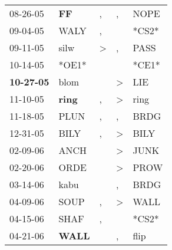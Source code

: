 \begin{supertabular}{p{0.07\textwidth}p{0.06\textwidth}p{0.02\textwidth}p{0.02\textwidth}p{0.06\textwidth}}
          08-26-05\textsuperscript{} &    \textbf{FF\textsuperscript{}} &                , &                , &           NOPE\textsuperscript{} \\
          09-04-05\textsuperscript{} &           WALY\textsuperscript{} &                , &                  &                            *CS2* \\
          09-11-05\textsuperscript{} &           silw\textsuperscript{} &     \textgreater &                , &           PASS\textsuperscript{} \\
          10-14-05\textsuperscript{} &                            *OE1* &                  &                  &                            *CE1* \\
 \textbf{10-27-05\textsuperscript{}} &           blom\textsuperscript{} &                  &     \textgreater &            LIE\textsuperscript{} \\
          11-10-05\textsuperscript{} &  \textbf{ring\textsuperscript{}} &                , &     \textgreater &           ring\textsuperscript{} \\
          11-18-05\textsuperscript{} &           PLUN\textsuperscript{} &                , &                , &           BRDG\textsuperscript{} \\
          12-31-05\textsuperscript{} &           BILY\textsuperscript{} &                , &     \textgreater &           BILY\textsuperscript{} \\
          02-09-06\textsuperscript{} &           ANCH\textsuperscript{} &                  &     \textgreater &           JUNK\textsuperscript{} \\
          02-20-06\textsuperscript{} &           ORDE\textsuperscript{} &                  &     \textgreater &           PROW\textsuperscript{} \\
          03-14-06\textsuperscript{} &           kabu\textsuperscript{} &                  &                , &           BRDG\textsuperscript{} \\
          04-09-06\textsuperscript{} &           SOUP\textsuperscript{} &                , &     \textgreater &           WALL\textsuperscript{} \\
          04-15-06\textsuperscript{} &           SHAF\textsuperscript{} &                , &                  &                            *CS2* \\
          04-21-06\textsuperscript{} &  \textbf{WALL\textsuperscript{}} &                  &                , &           flip\textsuperscript{} \\

\end{supertabular}

